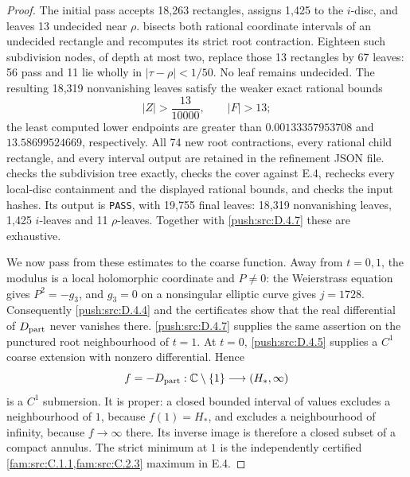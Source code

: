 \begin{proof}
The initial pass accepts 18,263 rectangles, assigns 1,425 to the
\(i\)-disc, and leaves 13 undecided near \(\rho\).
 bisects both rational coordinate
intervals of an undecided rectangle and recomputes its strict root
contraction. Eighteen such subdivision nodes, of depth at most two,
replace those 13 rectangles by 67 leaves: 56 pass and 11 lie wholly
in \(|\tau-\rho|<1/50\). No leaf remains undecided. The resulting
18,319 nonvanishing leaves satisfy the weaker exact rational bounds
\[
 |Z|>\frac{13}{10000},\qquad |F|>13;
\]
the least computed lower endpoints are greater than
\(0.00133357953708\) and \(13.58699524669\), respectively.
All 74 new root contractions, every rational child rectangle, and
every interval output are retained in the refinement JSON file.
 checks the subdivision tree
exactly, checks the cover against E.4, rechecks every local-disc
containment and the displayed rational bounds, and checks the input
hashes. Its output is \texttt{PASS}, with 19,755 final leaves:
18,319 nonvanishing leaves, 1,425 \(i\)-leaves and 11
\(\rho\)-leaves. Together with \ref{push:src:D.4.7} these are exhaustive.

We now pass from these estimates to the coarse function. Away from
\(t=0,1\), the modulus is a local holomorphic coordinate and
\(P\ne0\): the Weierstrass equation gives \(P^2=-g_3\), and
\(g_3=0\) on a nonsingular elliptic curve gives \(j=1728\).
Consequently \ref{push:src:D.4.4} and the certificates show that the real
differential of \(D_{\rm part}\) never vanishes there. \ref{push:src:D.4.7}
supplies the same assertion on the punctured root neighbourhood
of \(t=1\). At \(t=0\), \ref{push:src:D.4.5} supplies a \(C^1\) coarse
extension with nonzero differential. Hence
\[
 f=-D_{\rm part}:\mathbb C\setminus\{1\}
               \longrightarrow(H_*,\infty)
\]
is a \(C^1\) submersion. It is proper: a closed bounded interval
of values excludes a neighbourhood of \(1\), because
\(f(1)=H_*\), and excludes a neighbourhood of infinity, because
\(f\to\infty\) there. Its inverse image is therefore a closed
subset of a compact annulus. The strict minimum at \(1\) is the
independently certified \cref{fam:src:C.1.1,fam:src:C.2.3} maximum in E.4.


\end{proof}
